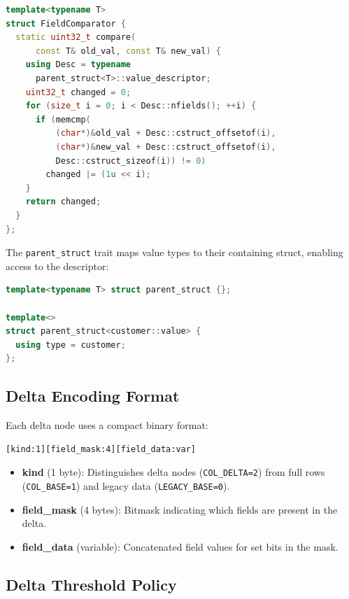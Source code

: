 \documentclass[letterpaper,twocolumn,10pt]{article}
\begin{document}
\begin{lstlisting}[language=C++,basicstyle=\small\ttfamily]
template<typename T>
struct FieldComparator {
  static uint32_t compare(
      const T& old_val, const T& new_val) {
    using Desc = typename 
      parent_struct<T>::value_descriptor;
    uint32_t changed = 0;
    for (size_t i = 0; i < Desc::nfields(); ++i) {
      if (memcmp(
          (char*)&old_val + Desc::cstruct_offsetof(i),
          (char*)&new_val + Desc::cstruct_offsetof(i),
          Desc::cstruct_sizeof(i)) != 0)
        changed |= (1u << i);
    }
    return changed;
  }
};
\end{lstlisting}

The \texttt{parent\_struct} trait maps value types to their containing struct, enabling access to the descriptor:

\begin{lstlisting}[language=C++,basicstyle=\small\ttfamily]
template<typename T> struct parent_struct {};

template<>
struct parent_struct<customer::value> {
  using type = customer;
};
\end{lstlisting}

\subsection{Delta Encoding Format}

Each delta node uses a compact binary format:

\begin{verbatim}
[kind:1][field_mask:4][field_data:var]
\end{verbatim}

\begin{itemize}
\item \textbf{kind} (1 byte): Distinguishes delta nodes (\texttt{COL\_DELTA=2}) from full rows (\texttt{COL\_BASE=1}) and legacy data (\texttt{LEGACY\_BASE=0}).

\item \textbf{field\_mask} (4 bytes): Bitmask indicating which fields are present in the delta.

\item \textbf{field\_data} (variable): Concatenated field values for set bits in the mask.
\end{itemize}

\subsection{Delta Threshold Policy}
\end{document}
